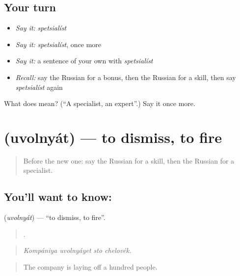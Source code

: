 \subsection*{Your turn}
\begin{itemize}
\raggedright
  \item \emph{Say it:} \emph{spetsialíst}
  \item \emph{Say it:} \emph{spetsialíst}, once more
  \item \emph{Say it:} a sentence of your own with \emph{spetsialíst}
  \item \emph{Recall:} say the Russian for a bonus, then the Russian for a skill, then say \emph{spetsialíst} again
\end{itemize}

\begin{tcolorbox}[breakable,colback=teal!4,colframe=teal!35!black,title={Before you move on}]
What does  mean? (\textquotedblleft{}A specialist, an expert\textquotedblright{}.) Say it once more.
\end{tcolorbox}
\section[\texorpdfstring{\ru{увольнять} (uvolnyát)}{увольнять (uvolnyát)}]{ (uvolnyát) — to dismiss, to fire}

\label{lesson:RU-C362-uvolnyat}



\begin{quote}
Before the new one: say the Russian for a skill, then the Russian for a specialist.
\end{quote}

\subsection*{You'll want to know: }
\textbf{} (\emph{uvolnyát}) — \textquotedblleft{}to dismiss, to fire\textquotedblright{}.

\begin{quote}
   .
\end{quote}

\begin{quote}
\emph{Kompániya uvolnyáyet sto chelovék.}
\end{quote}

\begin{quote}
The company is laying off a hundred people.
\end{quote}

